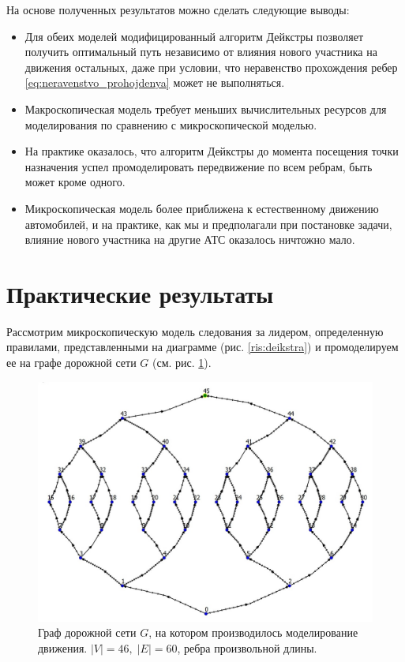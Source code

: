 \documentclass[12pt, a4paper]{article}
\begin{document}
На основе полученных результатов можно сделать следующие выводы:
\begin{itemize}
\item Для обеих моделей модифицированный алгоритм Дейкстры позволяет получить оптимальный путь независимо от влияния нового участника на движения остальных, даже при условии, что неравенство прохождения ребер \eqref{eq:neravenstvo_prohojdenya} может не выполняться.

\item Макроскопическая модель требует меньших вычислительных ресурсов для моделирования по сравнению с микроскопической моделью.

\item На практике оказалось, что алгоритм Дейкстры до момента посещения точки назначения успел промоделировать передвижение по всем ребрам, быть может кроме одного.

\item Микроскопическая модель более приближена к естественному движению автомобилей, и на практике, как мы и предполагали при постановке задачи, влияние нового участника на другие АТС оказалось ничтожно мало. 


\end{itemize}



\newpage
\section{Практические результаты}
Рассмотрим микроскопическую модель следования за лидером, определенную правилами, представленными на диаграмме (рис. \ref{ris:deikstra}) и промоделируем ее на графе дорожной сети $G$ (см. рис. \ref{ris:Graph}).

\begin{figure}[H]
	\centering
	\includegraphics[scale=0.25]{Graph_N.jpg}
	\caption{Граф дорожной сети $G$, на котором производилось моделирование движения. $|V| = 46, \; |E| = 60$, ребра произвольной длины.}
	\label{ris:Graph}
\end{figure}
\end{document}
